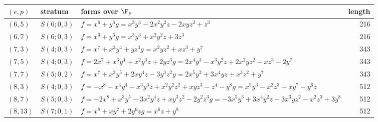 \begin{tabular}{@{}ll>{\raggedright\arraybackslash}p{6.4cm}r@{}}
\toprule
$(e,p)$ & stratum & forms over $\F_p$ & length\\
\midrule
$(6,5)$ & $S(6;0,3)$ & $f=x^{6} + y^{6}$\newline $g=x^{3}y^{3} - 2x^{2}y^{2}z - 2xyz^{2} + z^{3}$ & 216\\
$(6,7)$ & $S(6;0,3)$ & $f=x^{6} + y^{6}$\newline $g=x^{3}y^{3} + x^{2}y^{2}z + 3z^{3}$ & 216\\
$(7,3)$ & $S(4;0,3)$ & $f=x^{7} + x^{3}y^{4} + yz^{3}$\newline $g=x^{2}yz^{2} + xz^{3} + y^{7}$ & 343\\
$(7,5)$ & $S(4;0,3)$ & $f=2x^{7} + x^{3}y^{4} + x^{2}y^{3}z + 2yz^{3}$\newline $g=2x^{4}y^{3} - x^{3}y^{2}z + 2x^{2}yz^{2} - xz^{3} - 2y^{7}$ & 343\\
$(7,7)$ & $S(5;0,2)$ & $f=x^{7} + x^{2}y^{5} + 2xy^{4}z - 3y^{3}z^{2}$\newline $g=2x^{5}y^{2} + 3x^{4}yz + x^{3}z^{2} + y^{7}$ & 343\\
$(8,3)$ & $S(4;0,3)$ & $f=-x^{8} - x^{4}y^{4} - x^{3}y^{3}z + x^{2}y^{2}z^{2} + xyz^{3} - z^{4} - y^{8}$\newline $g=x^{5}y^{3} - x^{2}z^{3} + xy^{7} - y^{6}z$ & 512\\
$(8,7)$ & $S(5;0,3)$ & $f=-2x^{8} + x^{3}y^{5} - 3x^{2}y^{4}z + xy^{3}z^{2} - 2y^{2}z^{3}$\newline $g=-3x^{5}y^{3} + 3x^{4}y^{2}z + 3x^{3}yz^{2} - x^{2}z^{3} + 3y^{8}$ & 512\\
$(8,13)$ & $S(7;0,1)$ & $f=x^{8} + xy^{7} + 2y^{6}z$\newline $g=x^{6}z + y^{8}$ & 512\\
\bottomrule
\end{tabular}
